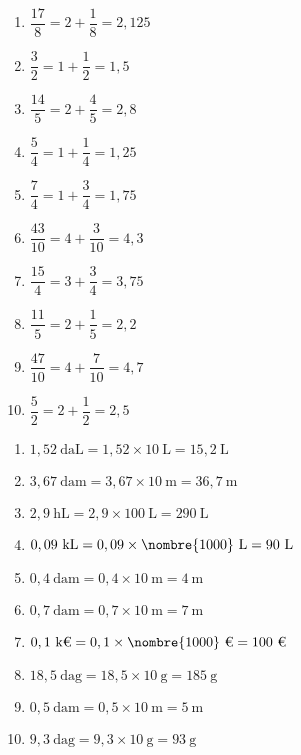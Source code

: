 \documentclass[a4paper,11pt,fleqn]{article}
\begin{document}
\begin{correction}
\exo{}

\begin{multicols}{2}
\begin{enumerate}[itemsep=2em]
	\item $ \dfrac{17}{8} = 2+\dfrac{1}{8} = 2,125 $
	\item $ \dfrac{3}{2} = 1+\dfrac{1}{2} = 1,5 $
	\item $ \dfrac{14}{5} = 2+\dfrac{4}{5} = 2,8 $
	\item $ \dfrac{5}{4} = 1+\dfrac{1}{4} = 1,25 $
	\item $ \dfrac{7}{4} = 1+\dfrac{3}{4} = 1,75 $
	\item $ \dfrac{43}{10} = 4+\dfrac{3}{10} = 4,3 $
	\item $ \dfrac{15}{4} = 3+\dfrac{3}{4} = 3,75 $
	\item $ \dfrac{11}{5} = 2+\dfrac{1}{5} = 2,2 $
	\item $ \dfrac{47}{10} = 4+\dfrac{7}{10} = 4,7 $
	\item $ \dfrac{5}{2} = 2+\dfrac{1}{2} = 2,5 $
\end{enumerate}
\end{multicols}

\exo{}

\begin{multicols}{2}
\begin{enumerate}
	\item $ 1,52~\text{daL} =  1,52\times10~\text{L} = 15,2~\text{L}$
	\item $ 3,67~\text{dam} =  3,67\times10~\text{m} = 36,7~\text{m}$
	\item $ 2,9~\text{hL} =  2,9\times100~\text{L} = 290~\text{L}$
	\item $ 0,09~\text{kL} =  0,09\times\nombre{1000}~\text{L} = 90~\text{L}$
	\item $ 0,4~\text{dam} =  0,4\times10~\text{m} = 4~\text{m}$
	\item $ 0,7~\text{dam} =  0,7\times10~\text{m} = 7~\text{m}$
	\item $ 0,1~\text{k€} =  0,1\times\nombre{1000}~\text{€} = 100~\text{€}$
	\item $ 18,5~\text{dag} =  18,5\times10~\text{g} = 185~\text{g}$
	\item $ 0,5~\text{dam} =  0,5\times10~\text{m} = 5~\text{m}$
	\item $ 9,3~\text{dag} =  9,3\times10~\text{g} = 93~\text{g}$
\end{enumerate}
\end{multicols}


\end{correction}
\end{document}
